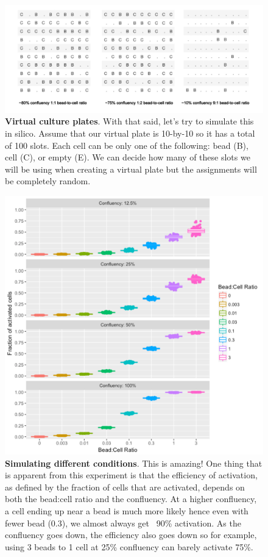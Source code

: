 \documentclass[10pt,letterpaper]{article}
\begin{document}
\begin{figure}[ht]
    \includegraphics[width=\textwidth]{fig-simulations-samples.pdf}
    \caption{
        \color{Gray} \textbf{Virtual culture plates}.
        With that said, let's try to simulate this in silico. Assume that our virtual plate is 10-by-10 so it has a total of 100 slots. Each cell can be only one of the following: bead (B), cell (C), or empty (E). We can decide how many of these slots we will be using when creating a virtual plate but the assignments will be completely random.
    }
    \label{fig-simulations}
\end{figure}


\begin{figure}[ht]
    \includegraphics[width=\textwidth]{fig-simulations.pdf}
    \caption{
        \color{Gray} \textbf{Simulating different conditions}.
        This is amazing! One thing that is apparent from this experiment is that the efficiency of activation, as defined by the fraction of cells that are activated, depends on both the bead:cell ratio and the confluency. At a higher confluency, a cell ending up near a bead is much more likely hence even with fewer bead (0.3), we almost always get ~90\% activation. As the confluency goes down, the efficiency also goes down so for example, using 3 beads to 1 cell at 25\% confluency can barely activate 75\%.
    }
    \label{fig-simulations}
\end{figure}
\end{document}
